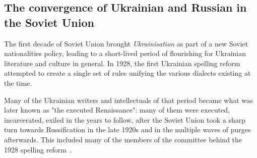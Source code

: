 \subsection{The convergence of Ukrainian and Russian in the Soviet
Union}\label{the-convergence-of-ukrainian-and-russian-in-the-soviet-union}

The first decade of Soviet Union brought \emph{Ukrainisation} as part of
a new Soviet nationalities policy, leading to a short-lived period of
flourishing for Ukrainian literature and culture in
general.\cite{5c48fce9-c05d-3d4e-94c1-cd6079bff660} In 1928, the first Ukrainian spelling reform attempted to create a single set of rules unifying the various dialects existing at the time.~\cite{karunyk2017ukrainian}

Many of the Ukrainian writers and intellectuals of that period became
what was later known as "the executed
Renaissance"\cite{1ad9e7d5-c0eb-33df-ae6c-1fdbd2549d75}:
many of them were executed, incarcerated, exiled in the years to
follow\cite{1130282272476965120}, after the Soviet Union took a sharp
turn towards Russification in the late 1920s and in the multiple waves
of purges afterwards.
This included many of the members of the committee behind the 1928 spelling reform~\cite{karunyk2017ukrainian}.%

